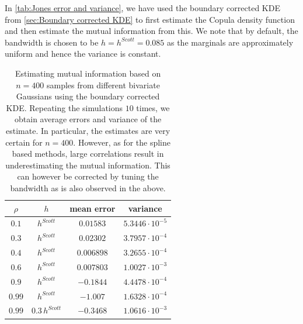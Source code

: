 \documentclass[../Thesis.tex]{subfiles}
\begin{document}
In \autoref{tab:Jones error and variance}, we have used the boundary corrected KDE from \autoref{sec:Boundary corrected KDE} to first estimate the Copula density function and then estimate the mutual information from this. We note that by default, the bandwidth is chosen to be $h = h^{Scott} = 0.085$ as the marginals are approximately uniform and hence the variance is constant.
\begin{table}[ht]
    \centering
    \begin{tabular}{c|c|c|c}
        $\rho$ & $h$              & mean error  & variance                 \\\hline
        $0.1$  & $h^{Scott}$      & $ 0.01583$  & $5.3446 \cdot 10^{-5}$   \\
        $0.3$  & $h^{Scott}$      & $ 0.02302$  & $3.7957 \cdot 10^{-4}$   \\
        $0.4$  & $h^{Scott}$      & $ 0.006898$ & $3.2655  \cdot 10^{-4}$  \\
        $0.6$  & $h^{Scott}$      & $ 0.007803$ & $1.0027  \cdot 10^{-3}$  \\
        $0.9$  & $h^{Scott}$      & $-0.1844$   & $4.4478  \cdot 10^{-4} $ \\
        $0.99$ & $h^{Scott}$      & $-1.007$    & $1.6328  \cdot 10^{-4}$  \\
        $0.99$ & $0.3\,h^{Scott}$ & $-0.3468$   & $1.0616  \cdot 10^{-3}$
    \end{tabular}
    \caption{Estimating mutual information based on $n=400$ samples from different bivariate Gaussians using the boundary corrected KDE. Repeating the simulations $10$ times, we obtain average errors and variance of the estimate. In particular, the estimates are very certain for $n=400$. However, as for the spline based methods, large correlations result in underestimating the mutual information. This can however be corrected by tuning the bandwidth as is also observed in the above.}
    \label{tab:Jones error and variance}
\end{table}
\end{document}
